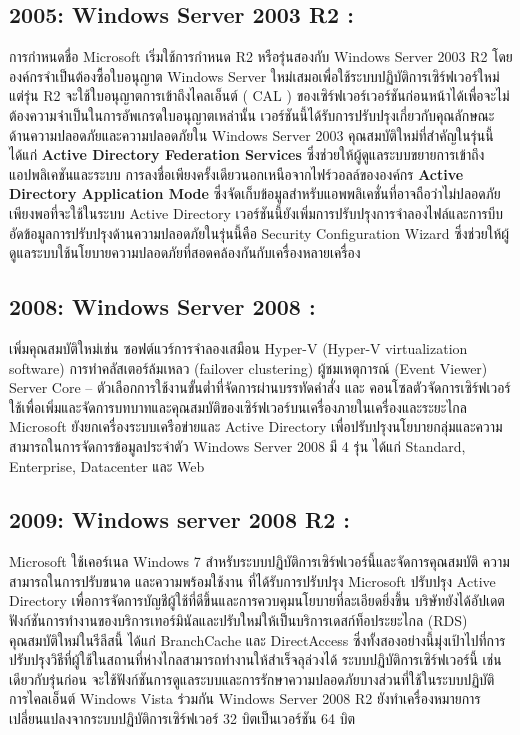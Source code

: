 \hspace{0cm}\subsection{2005: Windows Server 2003 R2 :}การกำหนดชื่อ Microsoft เริ่มใช้การกำหนด R2 หรือรุ่นสองกับ Windows Server 2003 R2 โดยองค์กรจำเป็นต้องซื้อใบอนุญาต Windows Server ใหม่เสมอเพื่อใช้ระบบปฏิบัติการเซิร์ฟเวอร์ใหม่ แต่รุ่น R2 จะใช้ใบอนุญาตการเข้าถึงไคลเอ็นต์ ( CAL ) ของเซิร์ฟเวอร์เวอร์ชันก่อนหน้าได้เพื่อจะไม่ต้องความจำเป็นในการอัพเกรดใบอนุญาตเหล่านั้น เวอร์ชันนี้ได้รับการปรับปรุงเกี่ยวกับคุณลักษณะด้านความปลอดภัยและความปลอดภัยใน Windows Server 2003 คุณสมบัติใหม่ที่สำคัญในรุ่นนี้ได้แก่ \textbf{Active Directory Federation Services }ซึ่งช่วยให้ผู้ดูแลระบบขยายการเข้าถึงแอปพลิเคชันและระบบ การลงชื่อเพียงครั้งเดียวนอกเหนือจากไฟร์วอลล์ขององค์กร \textbf{Active Directory Application Mode} ซึ่งจัดเก็บข้อมูลสำหรับแอพพลิเคชั่นที่อาจถือว่าไม่ปลอดภัยเพียงพอที่จะใช้ในระบบ Active Directory เวอร์ชันนี้ยังเพิ่มการปรับปรุงการจำลองไฟล์และการบีบอัดข้อมูลการปรับปรุงด้านความปลอดภัยในรุ่นนี้คือ Security Configuration Wizard ซึ่งช่วยให้ผู้ดูแลระบบใช้นโยบายความปลอดภัยที่สอดคล้องกันกับเครื่องหลายเครื่อง  

\hspace{0cm}\subsection{2008: Windows Server 2008 :} เพิ่มคุณสมบัติใหม่เช่น ซอฟต์แวร์การจำลองเสมือน Hyper-V (Hyper-V virtualization software) การทำคลัสเตอร์ล้มเหลว (failover clustering) ผู้ชมเหตุการณ์ (Event Viewer) Server Core -- ตัวเลือกการใช้งานขั้นต่ำที่จัดการผ่านบรรทัดคำสั่ง และ คอนโซลตัวจัดการเซิร์ฟเวอร์ ใช้เพื่อเพิ่มและจัดการบทบาทและคุณสมบัติของเซิร์ฟเวอร์บนเครื่องภายในเครื่องและระยะไกล  Microsoft ยังยกเครื่องระบบเครือข่ายและ Active Directory เพื่อปรับปรุงนโยบายกลุ่มและความสามารถในการจัดการข้อมูลประจำตัว Windows Server 2008 มี 4 รุ่น ได้แก่ Standard, Enterprise, Datacenter และ Web  
\clearpage

\hspace{0cm}\subsection{2009: Windows server 2008 R2 :} Microsoft ใช้เคอร์เนล Windows 7 สำหรับระบบปฏิบัติการเซิร์ฟเวอร์นี้และจัดการคุณสมบัติ ความสามารถในการปรับขนาด  และความพร้อมใช้งาน ที่ได้รับการปรับปรุง Microsoft ปรับปรุง Active Directory เพื่อการจัดการบัญชีผู้ใช้ที่ดีขึ้นและการควบคุมนโยบายที่ละเอียดยิ่งขึ้น บริษัทยังได้อัปเดตฟังก์ชันการทำงานของบริการเทอร์มินัลและปรับใหม่ให้เป็นบริการเดสก์ท็อประยะไกล (RDS) คุณสมบัติใหม่ในรีลีสนี้ ได้แก่ BranchCache และ DirectAccess ซึ่งทั้งสองอย่างนี้มุ่งเป้าไปที่การปรับปรุงวิธีที่ผู้ใช้ในสถานที่ห่างไกลสามารถทำงานให้สำเร็จลุล่วงได้ ระบบปฏิบัติการเซิร์ฟเวอร์นี้ เช่นเดียวกับรุ่นก่อน จะใช้ฟังก์ชันการดูแลระบบและการรักษาความปลอดภัยบางส่วนที่ใช้ในระบบปฏิบัติการไคลเอ็นต์ Windows Vista ร่วมกัน Windows Server 2008 R2 ยังทำเครื่องหมายการเปลี่ยนแปลงจากระบบปฏิบัติการเซิร์ฟเวอร์ 32 บิตเป็นเวอร์ชัน 64 บิต


